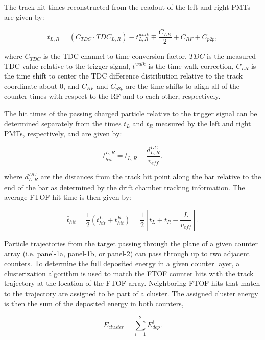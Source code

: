 \documentclass{elsart}
\begin{document}
The track hit times reconstructed from the readout of the left and right PMTs are given by:

\begin{equation}
t_{L,R} = (C_{TDC} \cdot TDC_{L,R}) - t_{L,R}^{walk} \mp \frac{C_{LR}}{2} + C_{RF} + C_{p2p},
\end{equation}

\noindent
where $C_{TDC}$ is the TDC channel to time conversion factor, $TDC$ is the measured TDC value relative
to the trigger signal, $t^{walk}$ is the time-walk correction, $C_{LR}$ is the time shift to center the TDC
difference distribution relative to the track coordinate about 0, and $C_{RF}$ and $C_{p2p}$ are the time
shifts to align all of the counter times with respect to the RF and to each other, respectively.

The hit times of the passing charged particle relative to the trigger signal can be determined separately 
from the times $t_L$ and $t_R$ measured by the left and right PMTs, respectively, and are given by:

\begin{equation}
t_{hit}^{L,R} = t_{L,R} - \frac{d^{DC}_{L,R}}{v_{eff}}.
\end{equation}

\noindent
where $d^{DC}_{L,R}$ are the distances from the track hit point along the bar relative to the end of the
bar as determined by the drift chamber tracking information. The average FTOF hit time is then given by:

\begin{equation}
\bar{t}_{hit} = \frac{1}{2} ( t_{hit}^L + t_{hit}^R ) = \frac{1}{2} \left[ t_L + t_R - \frac{L}{v_{eff}} \right].
\end{equation}

Particle trajectories from the target passing through the plane of a given counter array (i.e. panel-1a,
panel-1b, or panel-2) can pass through up to two adjacent counters. To determine the full deposited
energy in a given counter layer, a clusterization algorithm is used to match the FTOF counter hits with
the track trajectory at the location of the FTOF array. Neighboring FTOF hits that match to the trajectory
are assigned to be part of a cluster. The assigned cluster energy is then the sum of the deposited energy
in both counters,

\begin{equation}
  E_{cluster} = \sum_{i=1}^{2} E_{dep}^i.
\end{equation}
\end{document}
